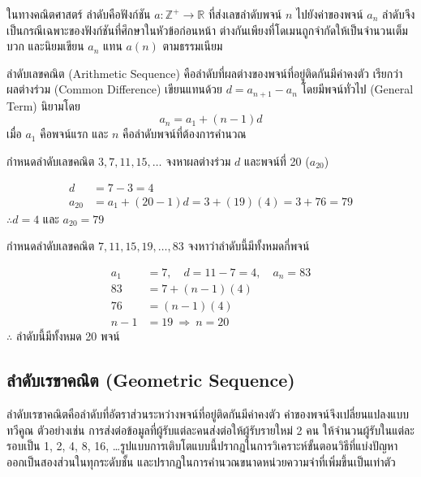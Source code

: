 ในทางคณิตศาสตร์ ลำดับคือฟังก์ชัน $a : \mathbb{Z}^+ \to \mathbb{R}$ ที่ส่งเลขลำดับพจน์ $n$ ไปยังค่าของพจน์ $a_n$ ลำดับจึงเป็นกรณีเฉพาะของฟังก์ชันที่ศึกษาในหัวข้อก่อนหน้า ต่างกันเพียงที่โดเมนถูกจำกัดให้เป็นจำนวนเต็มบวก และนิยมเขียน $a_n$ แทน $a(n)$ ตามธรรมเนียม

\begin{definition}
ลำดับเลขคณิต (Arithmetic Sequence) คือลำดับที่ผลต่างของพจน์ที่อยู่ติดกันมีค่าคงตัว เรียกว่า ผลต่างร่วม (Common Difference) เขียนแทนด้วย $d = a_{n+1} - a_n$ โดยมีพจน์ทั่วไป (General Term) นิยามโดย
\[ a_n = a_1 + (n-1)d \]
เมื่อ $a_1$ คือพจน์แรก และ $n$ คือลำดับพจน์ที่ต้องการคำนวณ
\end{definition}

\begin{ex}
\label{ex:arithmetic-seq-find-term}
กำหนดลำดับเลขคณิต $3, 7, 11, 15, \dots$ จงหาผลต่างร่วม $d$ และพจน์ที่ 20 ($a_{20}$)
\end{ex}
\begin{solution}
\begin{align*}
d &= 7 - 3 = 4\\
a_{20} &= a_1 + (20-1)d = 3 + (19)(4) = 3 + 76 = 79
\end{align*}
$\therefore d = 4$ และ $a_{20} = 79$ \solhere
\end{solution}

\begin{ex}
\label{ex:arithmetic-sequence-find-n}
กำหนดลำดับเลขคณิต $7, 11, 15, 19, \dots, 83$ จงหาว่าลำดับนี้มีทั้งหมดกี่พจน์
\end{ex}
\begin{solution}
\begin{align*}
a_1 &= 7, \quad d = 11 - 7 = 4, \quad a_n = 83\\
83 &= 7 + (n-1)(4)\\
76 &= (n-1)(4)\\
n-1 &= 19 \ \Rightarrow \ n = 20
\end{align*}
$\therefore$ ลำดับนี้มีทั้งหมด 20 พจน์ \solhere
\end{solution}

\subsection{ลำดับเรขาคณิต (Geometric Sequence)}
\label{sec:geometric-sequence}
ลำดับเรขาคณิตคือลำดับที่อัตราส่วนระหว่างพจน์ที่อยู่ติดกันมีค่าคงตัว ค่าของพจน์จึงเปลี่ยนแปลงแบบทวีคูณ ตัวอย่างเช่น การส่งต่อข้อมูลที่ผู้รับแต่ละคนส่งต่อให้ผู้รับรายใหม่ 2 คน ให้จำนวนผู้รับในแต่ละรอบเป็น 1, 2, 4, 8, 16, \dots รูปแบบการเติบโตแบบนี้ปรากฏในการวิเคราะห์ขั้นตอนวิธีที่แบ่งปัญหาออกเป็นสองส่วนในทุกระดับชั้น และปรากฏในการคำนวณขนาดหน่วยความจำที่เพิ่มขึ้นเป็นเท่าตัว~\parencite{lipschutz2009discrete}

